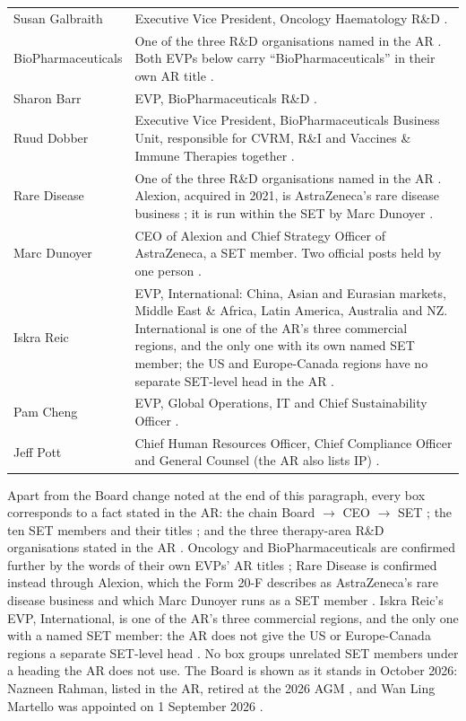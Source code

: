 \begin{xltabular}{\linewidth}{@{}>{\raggedright\arraybackslash}p{3.4cm}Y@{}}
Susan Galbraith & Executive Vice President, Oncology Haematology R\&D \cite[p.~70]{AR}. \\
BioPharmaceuticals & One of the three R\&D organisations named in the AR \cite[p.~26]{AR}. Both EVPs below carry ``BioPharmaceuticals'' in their own AR title \cite[p.~70]{AR}. \\
Sharon Barr & EVP, BioPharmaceuticals R\&D \cite[p.~70]{AR}. \\
Ruud Dobber & Executive Vice President, BioPharmaceuticals Business Unit, responsible for CVRM, R\&I and Vaccines \& Immune Therapies together \cite[p.~70]{AR}. \\
Rare Disease & One of the three R\&D organisations named in the AR \cite[p.~26]{AR}. Alexion, acquired in 2021, is AstraZeneca's rare disease business \cite[Item~4.A]{F20}; it is run within the SET by Marc Dunoyer \cite[p.~70]{AR}. \\
Marc Dunoyer & CEO of Alexion and Chief Strategy Officer of AstraZeneca, a SET member. Two official posts held by one person \cite[p.~70]{AR}. \\
Iskra Reic & EVP, International: China, Asian and Eurasian markets, Middle East \& Africa, Latin America, Australia and NZ. International is one of the AR's three commercial regions, and the only one with its own named SET member; the US and Europe-Canada regions have no separate SET-level head in the AR \cite[pp.~32, 70]{AR}. \\
Pam Cheng & EVP, Global Operations, IT and Chief Sustainability Officer \cite[p.~70]{AR}. \\
Jeff Pott & Chief Human Resources Officer, Chief Compliance Officer and General Counsel (the AR also lists IP) \cite[p.~70]{AR}. \\
\end{xltabular}

Apart from the Board change noted at the end of this paragraph, every box corresponds to a fact stated in the AR: the chain Board $\rightarrow$ CEO $\rightarrow$ SET \cite[pp.~67, 70]{AR}; the ten SET members and their titles \cite[p.~70]{AR}; and the three therapy-area R\&D organisations stated in the AR \cite[p.~26]{AR}. Oncology and BioPharmaceuticals are confirmed further by the words of their own EVPs' AR titles \cite[p.~70]{AR}; Rare Disease is confirmed instead through Alexion, which the Form 20-F describes as AstraZeneca's rare disease business \cite[Item~4.A]{F20} and which Marc Dunoyer runs as a SET member \cite[p.~70]{AR}. Iskra Reic's EVP, International, is one of the AR's three commercial regions, and the only one with a named SET member: the AR does not give the US or Europe-Canada regions a separate SET-level head \cite[pp.~32, 70]{AR}. No box groups unrelated SET members under a heading the AR does not use. The Board is shown as it stands in October 2026: Nazneen Rahman, listed in the AR, retired at the 2026 AGM \cite{AGM26}, and Wan Ling Martello was appointed on 1 September 2026 \cite{MART}.

